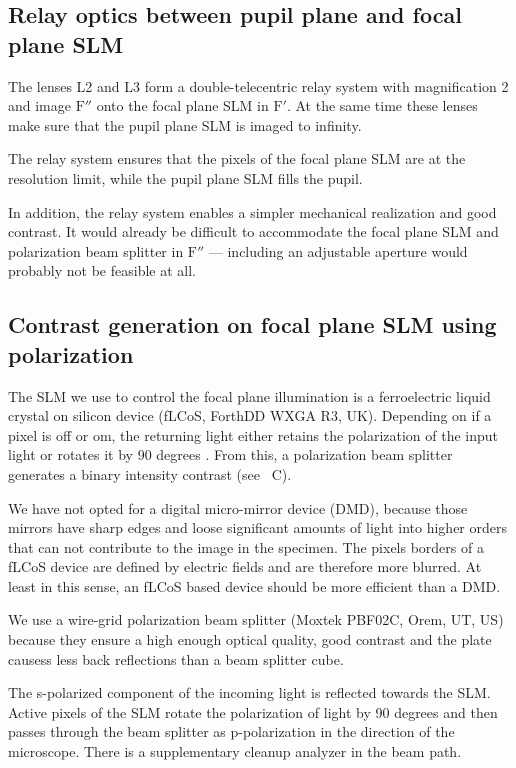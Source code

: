\subsection{Relay optics between pupil plane and focal plane SLM}
The lenses L2 and L3 form a double-telecentric relay system with
magnification 2 and image $\textrm{F}''$ onto the focal plane SLM in
$\textrm{F}'$. At the same time these lenses make sure that the pupil
plane SLM is imaged to infinity.
 
The relay system ensures that the pixels of the focal plane SLM are at
the resolution limit, while the pupil plane SLM fills the pupil.

In addition, the relay system enables a simpler mechanical realization
and good contrast. It would already be difficult to accommodate the
focal plane SLM and polarization beam splitter in $\textrm{F}''$ ---
including an adjustable aperture would probably not be feasible at
all.


\subsection{ Contrast generation on focal plane SLM using
  polarization}
The SLM we use to control the focal plane illumination is a           
ferroelectric liquid crystal on silicon device (fLCoS, ForthDD WXGA R3,
UK). Depending on if a pixel is off or om, the returning light either
retains the polarization of the input light or rotates it by 90
degrees \citep{Martinez-Garcia2009}.  From this, a polarization beam
splitter generates a binary intensity contrast (see
~C).

We have not opted for a digital micro-mirror device (DMD), because
those mirrors have sharp edges and loose significant amounts of light
into higher orders that can not contribute to the image in the
specimen. The pixels borders of a fLCoS device are defined by electric
fields and are therefore more blurred. At least in this sense, an
fLCoS based device should be more efficient than a DMD.

We use a wire-grid polarization beam splitter (Moxtek PBF02C,     
Orem, UT, US) because they ensure a high enough optical quality, good
contrast and the plate causess less back reflections than a beam
splitter cube.



The s-polarized component of the incoming light is reflected towards
the SLM. Active pixels of the SLM rotate the polarization of light by
90 degrees and then passes through the beam splitter as p-polarization
in the direction of the microscope. There is a supplementary cleanup
analyzer in the beam path. 

